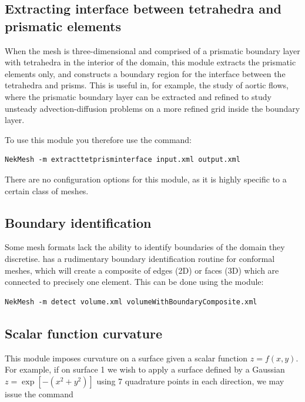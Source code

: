 \subsection{Extracting interface between tetrahedra and prismatic elements}

When the mesh is three-dimensional and comprised of a prismatic boundary layer
with tetrahedra in the interior of the domain, this module extracts the
prismatic elements only, and constructs a boundary region for the interface
between the tetrahedra and prisms. This is useful in, for example, the study of
aortic flows, where the prismatic boundary layer can be extracted and refined to
study unsteady advection-diffusion problems on a more refined grid inside the
boundary layer.

To use this module you therefore use the command:

\begin{lstlisting}[style=BashInputStyle]
  NekMesh -m extracttetprisminterface input.xml output.xml
\end{lstlisting}

There are no configuration options for this module, as it is highly specific to
a certain class of meshes.

\subsection{Boundary identification}

Some mesh formats lack the ability to identify boundaries of the domain they
discretise. \nm has a rudimentary boundary identification routine for conformal
meshes, which will create a composite of edges (2D) or faces (3D) which are
connected to precisely one element. This can be done using the 
module:

\begin{lstlisting}[style=BashInputStyle]
  NekMesh -m detect volume.xml volumeWithBoundaryComposite.xml
\end{lstlisting}

\subsection{Scalar function curvature}

This module imposes curvature on a surface given a scalar function
$z=f(x,y)$. For example, if on surface 1 we wish to apply a surface defined by a
Gaussian $z = \exp[-(x^2+y^2)]$ using 7 quadrature points in each direction, we
may issue the command

